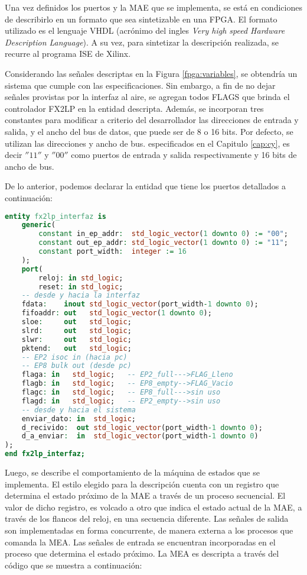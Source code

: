 Una vez definidos los puertos y la MAE que se implementa, se está en condiciones de describirlo en un formato que sea sintetizable en una FPGA. El formato utilizado es el lenguaje VHDL (acrónimo del ingles {\it Very high speed Hardware Description Language}). A su vez, para sintetizar la descripción realizada, se recurre al programa ISE de Xilinx.

Considerando las señales descriptas en la Figura \ref{fpga:variables}, se obtendría un sistema que cumple con las especificaciones. Sin embargo, a fin de no dejar señales provistas por la interfaz al aire, se agregan todos FLAGS que brinda el controlador FX2LP en la entidad descripta. Además, se incorporan tres constantes para modificar a criterio del desarrollador las direcciones de entrada y salida, y el ancho del bus de datos, que puede ser de 8 o 16 bits. Por defecto, se utilizan las direcciones y ancho de bus. especificados en el Capitulo \ref{cap:cy}, es decir $''11''$ y $''00''$ como puertos de entrada y salida respectivamente y 16 bits de ancho de bus.

De lo anterior, podemos declarar la entidad que tiene los puertos detallados a continuación:

\begin{lstlisting}[language=VHDL,backgroundcolor=\color{gray!30}]
entity fx2lp_interfaz is
	generic(
		constant in_ep_addr:  std_logic_vector(1 downto 0) := "00";
		constant out_ep_addr: std_logic_vector(1 downto 0) := "11";
		constant port_width:  integer := 16
	);
	port(
		reloj: in std_logic;
		reset: in std_logic;
	-- desde y hacia la interfaz
	fdata:    inout std_logic_vector(port_width-1 downto 0);
	fifoaddr: out	std_logic_vector(1 downto 0);
	sloe: 	  out	std_logic;
	slrd:     out	std_logic;
	slwr:     out	std_logic;
	pktend:   out	std_logic;
	-- EP2 isoc in (hacia pc)
	-- EP8 bulk out (desde pc)
	flaga: in	std_logic;   -- EP2_full--->FLAG_Lleno
	flagb: in	std_logic;   -- EP8_empty-->FLAG_Vacio
	flagc: in	std_logic;   -- EP8_full--->sin uso
	flagd: in	std_logic;   -- EP2_empty-->sin uso
	-- desde y hacia el sistema
	enviar_dato: in  std_logic;
	d_recivido:  out std_logic_vector(port_width-1 downto 0);
	d_a_enviar:  in  std_logic_vector(port_width-1 downto 0)
);
end fx2lp_interfaz;
\end{lstlisting}

Luego, se describe el comportamiento de la máquina de estados que se implementa. El estilo elegido para la descripción cuenta con un registro que determina el estado próximo de la MAE a través de un proceso secuencial. El valor de dicho registro, es volcado a otro que indica el estado actual de la MAE, a través de los flancos del reloj, en una secuencia diferente. Las señales de salida son implementadas en forma concurrente, de manera externa a los procesos que comanda la MEA. Las señales de entrada se encuentran incorporadas en el proceso que determina el estado próximo.
La MEA es descripta a través del código que se muestra a continuación:

